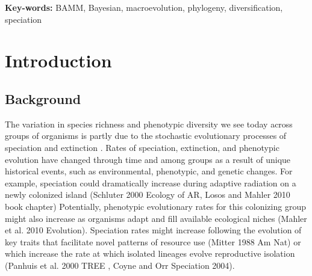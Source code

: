 \documentclass[12pt]{article}
\begin{document}
\begin{flushleft}
\textbf{Key-words:} BAMM, Bayesian, macroevolution, phylogeny, diversification, speciation
\end{flushleft}


\pagebreak[4]


\section*{Introduction}

\subsection*{Background}

The variation in species richness and phenotypic diversity we see today
across groups of organisms is partly due to the stochastic
evolutionary processes of speciation and extinction \citep{rab14plos}.
%
Rates of speciation, extinction, and phenotypic evolution
have changed through time and among groups
as a result of unique historical events,
such as environmental, phenotypic, and genetic changes.
%
For example, speciation could dramatically increase
during adaptive radiation on a newly colonized island (Schluter 2000 Ecology of AR, Losos and Mahler 2010 book chapter)
%
%
Potentially, phenotypic evolutionary rates for this colonizing group
might also increase as organisms adapt and fill
available ecological niches (Mahler et al. 2010 Evolution).
%
Speciation rates might increase following the evolution of key traits that 
facilitate novel patterns of resource use (Mitter 1988 Am Nat) or which increase the rate at which 
isolated lineages evolve reproductive isolation (Panhuis et al. 2000 TREE , Coyne and Orr Speciation 2004).
\end{document}
